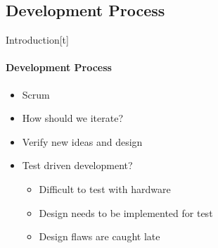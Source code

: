 \subsection{Development Process}
\begin{frame}{Introduction}[t]\framesubtitle{Development Process}
    \begin{itemize}
        \item Scrum
        \item How should we iterate?
        \item Verify new ideas and design
        \item Test driven development?
        \begin{itemize}
            \item Difficult to test with hardware
            \item Design needs to be implemented for test
            \item Design flaws are caught late
        \end{itemize}
    \end{itemize}
\end{frame}

